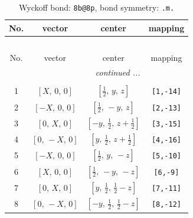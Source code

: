 \documentclass[fleqn,8pt]{jsarticle}
\begin{document}
\begin{longtable}{cccc}
\caption{Wyckoff bond: {\tt 8b@8p}, bond symmetry: {\tt .m.}}
 \\
 \hline \hline
No. & vector & center & mapping \\ \hline \endfirsthead

\multicolumn{3}{l}{\tablename\ \thetable{}} \\
 \hline \hline
No. & vector & center & mapping \\ \hline \endhead

 \hline \hline
\multicolumn{3}{r}{\footnotesize\it continued ...} \\ \endfoot

 \hline \hline
\multicolumn{3}{r}{} \\ \endlastfoot

1 & $\left[ X,\, 0,\, 0 \right]$ & $\left[ \frac{1}{2},\, y,\, z \right]$ & {\tt [1,-14]} \\ \hline
2 & $\left[ - X,\, 0,\, 0 \right]$ & $\left[ \frac{1}{2},\, - y,\, z \right]$ & {\tt [2,-13]} \\ \hline
3 & $\left[ 0,\, X,\, 0 \right]$ & $\left[ - y,\, \frac{1}{2},\, z + \frac{1}{2} \right]$ & {\tt [3,-15]} \\ \hline
4 & $\left[ 0,\, - X,\, 0 \right]$ & $\left[ y,\, \frac{1}{2},\, z + \frac{1}{2} \right]$ & {\tt [4,-16]} \\ \hline
5 & $\left[ - X,\, 0,\, 0 \right]$ & $\left[ \frac{1}{2},\, y,\, - z \right]$ & {\tt [5,-10]} \\ \hline
6 & $\left[ X,\, 0,\, 0 \right]$ & $\left[ \frac{1}{2},\, - y,\, - z \right]$ & {\tt [6,-9]} \\ \hline
7 & $\left[ 0,\, X,\, 0 \right]$ & $\left[ y,\, \frac{1}{2},\, \frac{1}{2} - z \right]$ & {\tt [7,-11]} \\ \hline
8 & $\left[ 0,\, - X,\, 0 \right]$ & $\left[ - y,\, \frac{1}{2},\, \frac{1}{2} - z \right]$ & {\tt [8,-12]} \\
\end{longtable}
\renewcommand{\arraystretch}{1.2}
\end{document}
